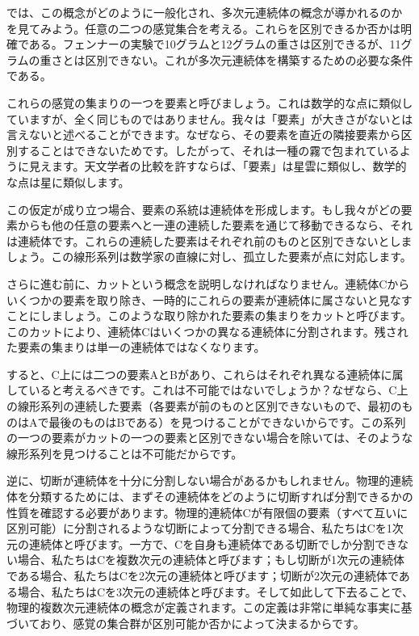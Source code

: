\documentclass[a4paper,11pt,openany]{ltjsbook}
\begin{document}
では、この概念がどのように一般化され、多次元連続体の概念が導かれるのかを見てみよう。任意の二つの感覚集合を考える。これらを区別できるか否かは明確である。フェンナーの実験で10グラムと12グラムの重さは区別できるが、11グラムの重さとは区別できない。これが多次元連続体を構築するための必要な条件である。

これらの感覚の集まりの一つを要素と呼びましょう。これは数学的な点に類似していますが、全く同じものではありません。我々は「要素」が大きさがないとは言えないと述べることができます。なぜなら、その要素を直近の隣接要素から区別することはできないためです。したがって、それは一種の霧で包まれているように見えます。天文学者の比較を許すならば、「要素」は星雲に類似し、数学的な点は星に類似します。

この仮定が成り立つ場合、要素の系統は連続体を形成します。もし我々がどの要素からも他の任意の要素へと一連の連続した要素を通じて移動できるなら、それは連続体です。これらの連続した要素はそれぞれ前のものと区別できないとしましょう。この線形系列は数学家の直線に対し、孤立した要素が点に対応します。

さらに進む前に、カットという概念を説明しなければなりません。連続体Cからいくつかの要素を取り除き、一時的にこれらの要素が連続体に属さないと見なすことにしましょう。このような取り除かれた要素の集まりをカットと呼びます。このカットにより、連続体Cはいくつかの異なる連続体に分割されます。残された要素の集まりは単一の連続体ではなくなります。

すると、C上には二つの要素AとBがあり、これらはそれぞれ異なる連続体に属していると考えるべきです。これは不可能ではないでしょうか？なぜなら、C上の線形系列の連続した要素（各要素が前のものと区別できないもので、最初のものはAで最後のものはBである）を見つけることができないからです。この系列の一つの要素がカットの一つの要素と区別できない場合を除いては、そのような線形系列を見つけることは不可能だからです。

逆に、切断が連続体を十分に分割しない場合があるかもしれません。物理的連続体を分類するためには、まずその連続体をどのように切断すれば分割できるかの性質を確認する必要があります。物理的連続体Cが有限個の要素（すべて互いに区別可能）に分割されるような切断によって分割できる場合、私たちはCを1次元の連続体と呼びます。一方で、Cを自身も連続体である切断でしか分割できない場合、私たちはCを複数次元の連続体と呼びます；もし切断が1次元の連続体である場合、私たちはCを2次元の連続体と呼びます；切断が2次元の連続体である場合、私たちはCを3次元の連続体と呼びます。そして如此して下去ることで、物理的複数次元連続体の概念が定義されます。この定義は非常に単純な事実に基づいており、感覚の集合群が区別可能か否かによって決まるからです。
\end{document}
